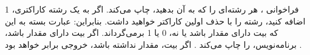 \section{}
\paragraph{}\label{answer:108}
فراخوانی ، هر رشته‌ای را که به آن بدهید، چاپ می‌کند. اگر به یک رشته کاراکتری، 1 اضافه کنید، رشته را با حذف اولین کاراکتر خواهید داشت. بنابراین:
\LTR\noindent
{}
\RTL
عبارت  بسته به این که بیت دارای مقدار باشد یا نه، 0 یا 1 برمی‌گرداند. اگر بیت دارای مقدار باشد، برنامه‌نویس،  را چاپ می‌کند . اگر بیت، مقدار نداشته باشد، خروجی برابر  خواهد بود .